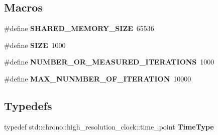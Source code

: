 \subsection*{Macros}
\begin{DoxyCompactItemize}
\item 
\#define {\bfseries S\+H\+A\+R\+E\+D\+\_\+\+M\+E\+M\+O\+R\+Y\+\_\+\+S\+I\+ZE}~65536\hypertarget{benchmark__common_8hh_a21a16aec41293c80beb10d71f79ad7a2}{}\label{benchmark__common_8hh_a21a16aec41293c80beb10d71f79ad7a2}

\item 
\#define {\bfseries S\+I\+ZE}~1000\hypertarget{benchmark__common_8hh_a70ed59adcb4159ac551058053e649640}{}\label{benchmark__common_8hh_a70ed59adcb4159ac551058053e649640}

\item 
\#define {\bfseries N\+U\+M\+B\+E\+R\+\_\+\+O\+R\+\_\+\+M\+E\+A\+S\+U\+R\+E\+D\+\_\+\+I\+T\+E\+R\+A\+T\+I\+O\+NS}~1000\hypertarget{benchmark__common_8hh_adf00b55c2043a89ad0ac69b3a2428281}{}\label{benchmark__common_8hh_adf00b55c2043a89ad0ac69b3a2428281}

\item 
\#define {\bfseries M\+A\+X\+\_\+\+N\+U\+N\+M\+B\+E\+R\+\_\+\+O\+F\+\_\+\+I\+T\+E\+R\+A\+T\+I\+ON}~10000\hypertarget{benchmark__common_8hh_adc5fa90d9af8c15b5dc4c72697821c36}{}\label{benchmark__common_8hh_adc5fa90d9af8c15b5dc4c72697821c36}

\end{DoxyCompactItemize}
\subsection*{Typedefs}
\begin{DoxyCompactItemize}
\item 
typedef std\+::chrono\+::high\+\_\+resolution\+\_\+clock\+::time\+\_\+point {\bfseries Time\+Type}\hypertarget{benchmark__common_8hh_ac3379ce076aff9d7667b3fc267a87f48}{}\label{benchmark__common_8hh_ac3379ce076aff9d7667b3fc267a87f48}

\end{DoxyCompactItemize}
